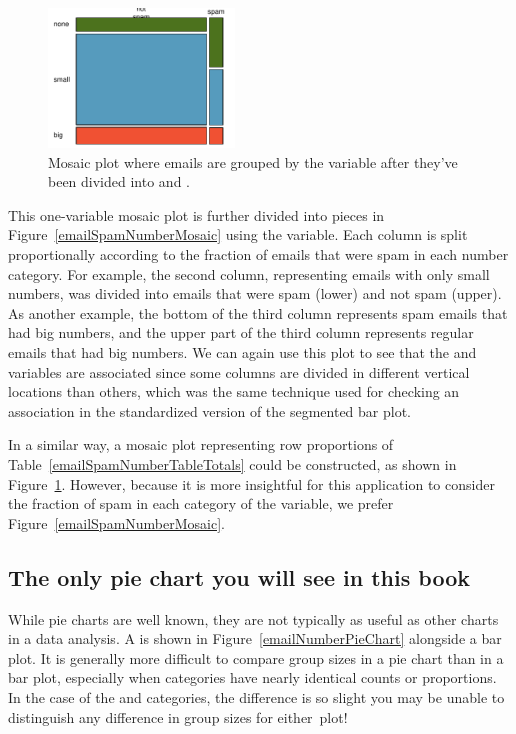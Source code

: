 \begin{figure}
   \centering
   \includegraphics[width=0.44\textwidth]{ch_intro_to_data/figures/emailSpamNumberMosaicPlot/emailSpamNumberMosaicRev}
   \caption{Mosaic plot where emails are grouped by the  variable after they've been divided into  and .}
   \label{emailSpamNumberMosaicRev}
\end{figure}

This one-variable mosaic plot is further divided into pieces in Figure~\ref{emailSpamNumberMosaic} using the  variable. Each column is split proportionally according to the fraction of emails that were spam in each number category. For example, the second column, representing emails with only small numbers, was divided into emails that were spam (lower) and not spam (upper). 
As another example, the bottom of the third column represents spam emails that had big numbers, and the upper part of the third column represents regular emails that had big numbers. We can again use this plot to see that the  and  variables are associated since some columns are divided in different vertical locations than others, which was the same technique used for checking an association in the standardized version of the segmented bar plot.

In a similar way, a mosaic plot representing row proportions of Table~\ref{emailSpamNumberTableTotals} could be constructed, as shown in Figure~\ref{emailSpamNumberMosaicRev}. However, because it is more insightful for this application to consider the fraction of spam in each category of the  variable, we prefer Figure~\ref{emailSpamNumberMosaic}.

\subsection{The only pie chart you will see in this book}

While pie charts are well known, they are not typically as useful as other charts in a data analysis. A  is shown in Figure~\vref{emailNumberPieChart} alongside a bar plot. It is generally more difficult to compare group sizes in a pie chart than in a bar plot, especially when categories have nearly identical counts or proportions. In the case of the  and  categories, the difference is so slight you may be unable to distinguish any difference in group sizes for either~plot!

